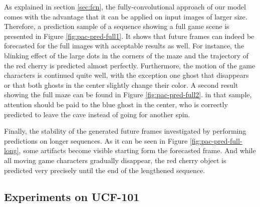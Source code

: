 As explained in section \ref{sec:fcn}, the fully-convolutional approach of our model comes with the advantage that it can be applied on input images of larger size. Therefore, a prediction sample of a sequence showing a full game scene is presented in Figure \ref{fig:pac-pred-full1}. It shows that future frames can indeed be forecasted for the full images with acceptable results as well. For instance, the blinking effect of the large dots in the corners of the maze and the trajectory of the red cherry is predicted almost perfectly. Furthermore, the motion of the game characters is continued quite well, with the exception one ghost that disappears or that both ghosts in the center slightly change their color. A second result showing the full maze can be found in Figure \ref{fig:pac-pred-full2}. in that sample, attention should be paid to the blue ghost in the center, who is correctly predicted to leave the cave instead of going for another spin.

Finally, the stability of the generated future frames investigated by performing predictions on longer sequences. As it can be seen in Figure \ref{fig:pac-pred-full-long}, some artifacts become visible starting form the  forecasted frame. And while all moving game characters gradually disappear, the red cherry object is predicted very precisely until the end of the lengthened sequence.
















































\iffalse
\subsection{Experiments on UCF-101}


